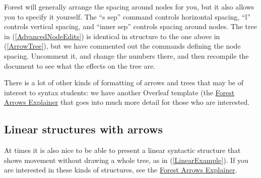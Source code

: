 \documentclass{article}
\begin{document}
Forest will generally arrange the spacing around nodes for you, but it also allows you to specify it yourself. The ``s sep'' command controls horizontal spacing, ``l'' controls vertical spacing, and ``inner sep'' controls spacing around nodes. The tree in (\ref{AdvancedNodeEdits}) is identical in structure to the one above in (\ref{ArrowTree}), but we have commented out the commands defining the node spacing. Uncomment it, and change the numbers there, and then recompile the document to see what the effects on the tree are.


\ea \label{AdvancedNodeEdits}
\z 

There is a lot of other kinds of formatting of arrows and trees that may be of interest to syntax students: we have another Overleaf template (the \href{https://www.overleaf.com/latex/templates/arrows-for-syntax-diagrams-with-forest/xjyvcszgcspv}{Forest Arrows Explainer} that goes into much more detail for those who are interested.

\subsection{Linear structures with arrows} \label{SectLinearDiagrams}

At times it is also nice to be able to present a linear syntactic structure that shows movement without drawing a whole tree, as in (\ref{LinearExample}). If you are interested in these kinds of structures, see the \href{https://www.overleaf.com/latex/templates/arrows-for-syntax-diagrams-with-forest/xjyvcszgcspv}{Forest Arrows Explainer}.

\vspace{2em} %
\end{document}
